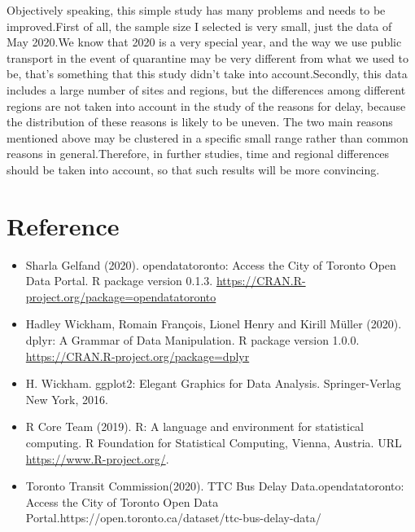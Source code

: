 \documentclass[
]{article}
\providecommand{\tightlist}{%
  \setlength{\itemsep}{0pt}\setlength{\parskip}{0pt}}
\begin{document}
Objectively speaking, this simple study has many problems and needs to
be improved.First of all, the sample size I selected is very small, just
the data of May 2020.We know that 2020 is a very special year, and the
way we use public transport in the event of quarantine may be very
different from what we used to be, that's something that this study
didn't take into account.Secondly, this data includes a large number of
sites and regions, but the differences among different regions are not
taken into account in the study of the reasons for delay, because the
distribution of these reasons is likely to be uneven. The two main
reasons mentioned above may be clustered in a specific small range
rather than common reasons in general.Therefore, in further studies,
time and regional differences should be taken into account, so that such
results will be more convincing.

\hypertarget{reference}{%
\section{Reference}\label{reference}}

\begin{itemize}
\tightlist
\item
  Sharla Gelfand (2020). opendatatoronto: Access the City of Toronto
  Open Data Portal. R package version 0.1.3.
  \url{https://CRAN.R-project.org/package=opendatatoronto}
\item
  Hadley Wickham, Romain François, Lionel Henry and Kirill Müller
  (2020). dplyr: A Grammar of Data Manipulation. R package version
  1.0.0. \url{https://CRAN.R-project.org/package=dplyr}
\item
  H. Wickham. ggplot2: Elegant Graphics for Data Analysis.
  Springer-Verlag New York, 2016.
\item
  R Core Team (2019). R: A language and environment for statistical
  computing. R Foundation for Statistical Computing, Vienna, Austria.
  URL \url{https://www.R-project.org/}.
\item
  Toronto Transit Commission(2020). TTC Bus Delay Data.opendatatoronto:
  Access the City of Toronto Open Data
  Portal.https://open.toronto.ca/dataset/ttc-bus-delay-data/
\end{itemize}
\end{document}
